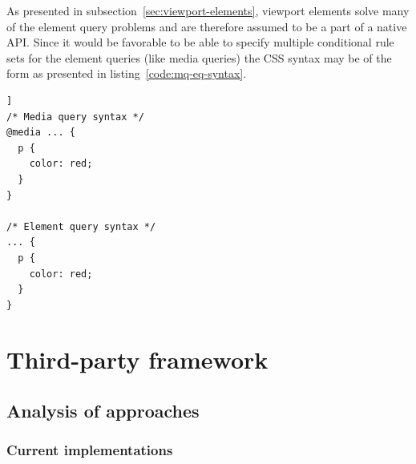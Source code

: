 \documentclass[a4paper,11pt]{kth-mag}
\begin{document}

        As presented in subsection~\ref{sec:viewport-elements}, \gls{viewport} \glspl{element} solve many of the element query problems and are therefore assumed to be a part of a \gls{native} \gls{API}.
        Since it would be favorable to be able to specify multiple conditional rule sets for the element queries (like \gls{media queries}) the \gls{CSS} syntax may be of the form as presented in listing~\ref{code:mq-eq-syntax}.
        \begin{lstlisting}[caption={Element queries are assumed to have nested rule sets, like \gls{media queries}},captionpos=b,label={code:mq-eq-syntax}]]
/* Media query syntax */
@media ... {
  p {
    color: red;
  }
}

/* Element query syntax */
... {
  p {
    color: red;
  }
}
        \end{lstlisting}

  \part{Third-party framework}\label{part:framework}

    \chapter{Analysis of approaches}\label{ch:current_approaches}
      \cite{eq_imp_localised-css,eq_imp_breakpointsjs,eq_imp_mediaclass,eq_imp_elementquery,eq_imp_element-queries,eq_imp_responsive-elements,eq_imp_magichtml,eq_imp_sickles,eq_imp_css-element-queries,eq_imp_responsive-elements-2,eq_imp_selector_queries,eq_imp_eqjs,eq_imp_breaks2000,eq_imp_classquery,eq_imp_eqcss,eq_imp_gss}
      \section{Current implementations}
\end{document}

